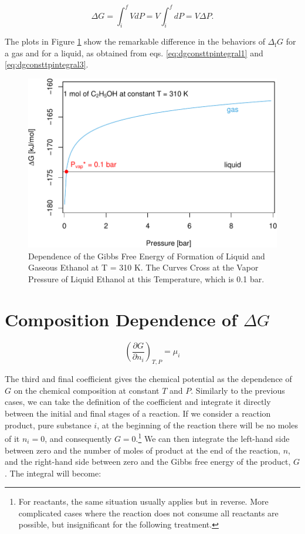 \documentclass[
  9pt,
]{extbook}
\theoremstyle{definition}
\theoremstyle{definition}
\theoremstyle{definition}
\theoremstyle{definition}
\theoremstyle{remark}
\begin{document}
\begin{equation}
\Delta G = \int_i^f VdP = V \int_i^f dP = V \Delta P.
\label{eq:dgconsttpintegral3}
\end{equation}

The plots in Figure \ref{fig:gdeppfig} show the remarkable difference in the behaviors of \(\Delta_{\text{f}} G\) for a gas and for a liquid, as obtained from eqs. \eqref{eq:dgconsttpintegral1} and \eqref{eq:dgconsttpintegral3}.

\begin{figure}

{\centering \includegraphics{pchem1_files/figure-latex/gdeppfig-1} 

}

\caption{Dependence of the Gibbs Free Energy of Formation of Liquid and Gaseous Ethanol at T = 310 K. The Curves Cross at the Vapor Pressure of Liquid Ethanol at this Temperature, which is 0.1 bar.}\label{fig:gdeppfig}
\end{figure}

\section{\texorpdfstring{Composition Dependence of \(\Delta G\)}{Composition Dependence of \textbackslash Delta G}}\label{composition-dependence-of-delta-g}

\[
\left(\frac{\partial G}{\partial n_i} \right)_{T,P}=\mu_i
\]

The third and final coefficient gives the chemical potential as the dependence of \(G\) on the chemical composition at constant \(T\) and \(P\). Similarly to the previous cases, we can take the definition of the coefficient and integrate it directly between the initial and final stages of a reaction. If we consider a reaction product, pure substance \(i\), at the beginning of the reaction there will be no moles of it \(n_i=0\), and consequently \(G=0\).\footnote{For reactants, the same situation usually applies but in reverse. More complicated cases where the reaction does not consume all reactants are possible, but insignificant for the following treatment.} We can then integrate the left-hand side between zero and the number of moles of product at the end of the reaction, \(n\), and the right-hand side between zero and the Gibbs free energy of the product, \(G\). The integral will become:
\end{document}
